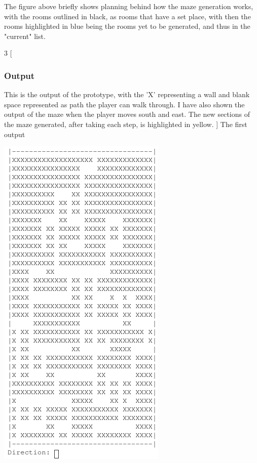 \documentclass[../Main.tex]{subfiles}
\begin{document}
        The figure above briefly shows planning behind how the maze generation works, with the rooms outlined in black, as rooms that have a set place, with then the rooms highlighted in blue being the rooms yet to be generated, and thus in the "current" list.

        \clearpage
        

        \clearpage
        \begin{multicols*}{3}
            [
                \subsubsection{Output}
                This is the output of the prototype, with the 'X' representing a wall and blank space represented as path the player can walk through. I have also shown the output of the maze when the player moves south and east. The new sections of the maze generated, after taking each step, is highlighted in yellow.
            ]
            The first output \par
            \centerline{\includegraphics[width=0.8\linewidth]{img/Design/Output1.png}}


\end{multicols*}
\end{document}
